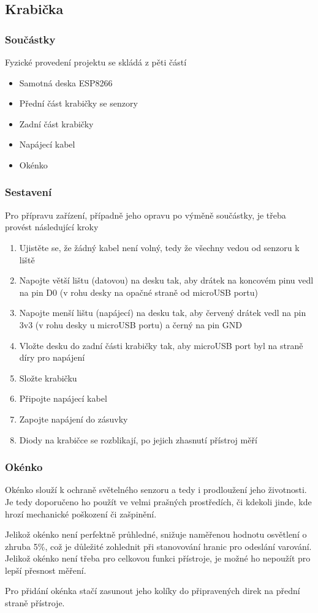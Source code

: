 \subsection{Krabička}
\subsubsection{Součástky}
Fyzické provedení projektu se skládá z pěti částí
\begin{itemize}
    \item Samotná deska ESP8266
    \item Přední část krabičky se senzory
    \item Zadní část krabičky
    \item Napájecí kabel
    \item Okénko
\end{itemize}
\subsubsection{Sestavení}
Pro přípravu zařízení, případně jeho opravu po výměně součástky, je třeba provést následující kroky
\begin{enumerate}
    \item Ujistěte se, že žádný kabel není volný, tedy že všechny vedou od senzoru k liště
    \item Napojte větší lištu (datovou) na desku tak, aby drátek na koncovém pinu vedl na pin D0 (v rohu desky na opačné straně od microUSB portu)
    \item Napojte menší lištu (napájecí) na desku tak, aby červený drátek vedl na pin 3v3 (v rohu desky u microUSB portu) a černý na pin GND
    \item Vložte desku do zadní části krabičky tak, aby microUSB port byl na straně díry pro napájení
    \item Složte krabičku
    \item Připojte napájecí kabel
    \item Zapojte napájení do zásuvky
    \item Diody na krabičce se rozblikají, po jejich zhasnutí přístroj měří
\end{enumerate}
\subsubsection{Okénko}
Okénko slouží k ochraně světelného senzoru a tedy i prodloužení jeho životnosti. Je tedy doporučeno ho použít ve velmi prašných prostředích, či kdekoli jinde, kde hrozí mechanické poškození či zašpinění.

Jelikož okénko není perfektně průhledné, snižuje naměřenou hodnotu osvětlení o zhruba 5\%, což je důležité zohlednit při stanovování hranic pro odeslání varování. Jelikož okénko není třeba pro celkovou funkci přístroje, je možné ho nepoužít pro lepší přesnost měření.

Pro přidání okénka stačí zasunout jeho kolíky do připravených direk na přední straně přístroje.